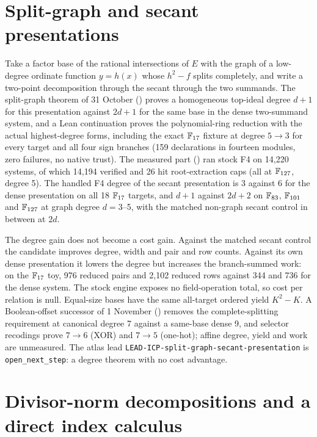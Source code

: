\section{Split-graph and secant presentations}\label{sec:pa-secant}

Take a factor base of the rational intersections of $E$ with the graph of a
low-degree ordinate function $y=h(x)$ whose $h^2-f$ splits completely, and
write a two-point decomposition through the secant through the two
summands. The split-graph theorem of 31 October
() proves a
homogeneous top-ideal degree $d+1$ for this presentation against $2d+1$ for
the same base in the dense two-summand system, and a Lean continuation
proves the polynomial-ring reduction with the actual highest-degree forms,
including the exact $\mathbb{F}_{17}$ fixture at degree $5\to3$ for every target and
all four sign branches (159 declarations in fourteen modules, zero failures,
no native trust). The measured part
()
ran stock F4 on 14{,}220 systems, of which 14{,}194 verified and 26 hit
root-extraction caps (all at $\mathbb{F}_{127}$, degree 5). The handled F4 degree of
the secant presentation is 3 against 6 for the dense presentation on all 18
$\mathbb{F}_{17}$ targets, and $d+1$ against $2d+2$ on $\mathbb{F}_{83}$, $\mathbb{F}_{101}$ and
$\mathbb{F}_{127}$ at graph degree $d=3$--5, with the matched non-graph secant
control in between at $2d$.

The degree gain does not become a cost gain. Against the matched secant
control the candidate improves degree, width and pair and row counts.
Against its own dense presentation it lowers the degree but increases the
branch-summed work: on the $\mathbb{F}_{17}$ toy, 976 reduced pairs and 2{,}102
reduced rows against 344 and 736 for the dense system. The stock engine
exposes no field-operation total, so cost per relation is null. Equal-size
bases have the same all-target ordered yield $K^2-K$. A Boolean-offset
successor of 1 November
()
removes the complete-splitting requirement at canonical degree 7 against a
same-base dense 9, and selector recodings prove $7\to6$ (XOR) and $7\to5$
(one-hot); affine degree, yield and work are unmeasured. The atlas lead
\texttt{LEAD-ICP-split-graph-secant-presentation} is \texttt{open\_next\_step}:
a degree theorem with no cost advantage.

\section{Divisor-norm decompositions and a direct index calculus}\label{sec:pa-divisor}

